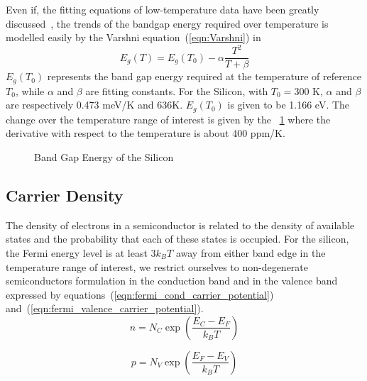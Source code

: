 Even if, the fitting equations of low-temperature data have been greatly discussed~\cite{Varshni1967,Allen1976,Manoogian1979,Donnell1991}, the trends of the bandgap energy required over temperature is modelled easily by the Varshni equation~(\ref{eqn:Varshni}) in~\cite{Varshni1967}
\begin{equation}
\label{eqn:Varshni}
E_g(T) = E_g(T_0) - \alpha \frac{T^2}{T+\beta}
\end{equation}
\(E_g(T_0) \) represents the band gap energy required at the temperature of reference \(T_0 \), while \(\alpha \) and \(\beta \) are fitting constants. For the Silicon, with \(T_0 = \)300 K, \(\alpha \) and \(\beta \) are respectively 0.473 meV/K and 636K. \(E_g(T_0) \) is given to be 1.166 eV. The change over the temperature range of interest is given by the \figurename~\ref{fig:bandgap} where the derivative with respect to the temperature is about 400 ppm/K.

\begin{figure}[!ht]
    \centering
    
    \caption{Band Gap Energy of the Silicon}
    \label{fig:bandgap}
\end{figure}

\subsection{Carrier Density}        %
\label{sec:carrier_density}
The density of electrons in a semiconductor is related to the density of available states and the probability that each of these states is occupied. For the silicon, the Fermi energy level is at least 3\(k_B T\) away from either band edge in the temperature range of interest, we restrict ourselves to non-degenerate semiconductors formulation in the conduction band and in the valence band expressed by equations~(\ref{eqn:fermi_cond_carrier_potential}) and~(\ref{eqn:fermi_valence_carrier_potential}).
\begin{equation}
\label{eqn:fermi_cond_carrier_potential}
n = N_C \exp\left( \frac{E_C - E_F}{k_B T} \right)
\end{equation}

\begin{equation}
\label{eqn:fermi_valence_carrier_potential}
p = N_V \exp\left( \frac{E_F - E_V}{k_B T} \right)
\end{equation}

